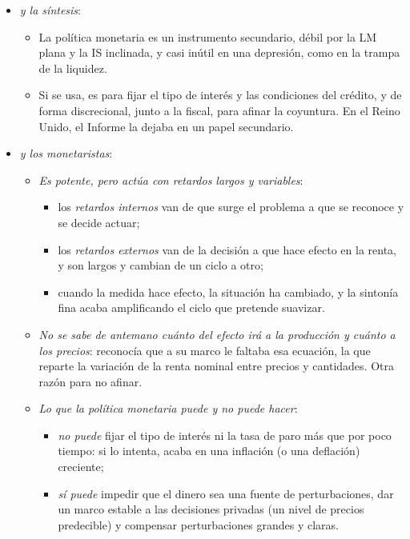 \documentclass[11pt]{article}
\begin{document}
\begin{itemize}
\item \emph{ y la síntesis}:
  \begin{itemize}
  \item La política monetaria es un instrumento secundario, débil por la LM plana y la IS inclinada, y casi inútil en una depresión, como en la trampa de la liquidez.
  \item Si se usa, es para fijar el tipo de interés y las condiciones del crédito, y de forma discrecional, junto a la fiscal, para afinar la coyuntura. En el Reino Unido, el Informe  la dejaba en un papel secundario\nocite{Radcliffe1959Report}.
  \end{itemize}
\item \emph{ y los monetaristas}:
  \begin{itemize}
  \item \emph{Es potente, pero actúa con retardos largos y variables}\nocite{Friedman1961Lag}:
    \begin{itemize}
    \item los \emph{retardos internos} van de que surge el problema a que se reconoce y se decide actuar;
    \item los \emph{retardos externos} van de la decisión a que hace efecto en la renta, y son largos y cambian de un ciclo a otro;
    \item cuando la medida hace efecto, la situación ha cambiado, y la sintonía fina acaba amplificando el ciclo que pretende suavizar.
    \end{itemize}
  \item \emph{No se sabe de antemano cuánto del efecto irá a la producción y cuánto a los precios}:  reconocía que a su marco le faltaba esa ecuación, la que reparte la variación de la renta nominal entre precios y cantidades\nocite{Friedman1970Theoretical}. Otra razón para no afinar.
  \item \emph{Lo que la política monetaria puede y no puede hacer}\nocite{Friedman1968Role}:
    \begin{itemize}
    \item \emph{no puede} fijar el tipo de interés ni la tasa de paro más que por poco tiempo: si lo intenta, acaba en una inflación (o una deflación) creciente;
    \item \emph{sí puede} impedir que el dinero sea una fuente de perturbaciones, dar un marco estable a las decisiones privadas (un nivel de precios predecible) y compensar perturbaciones grandes y claras.

\end{itemize}
\end{itemize}
\end{itemize}
\end{document}
